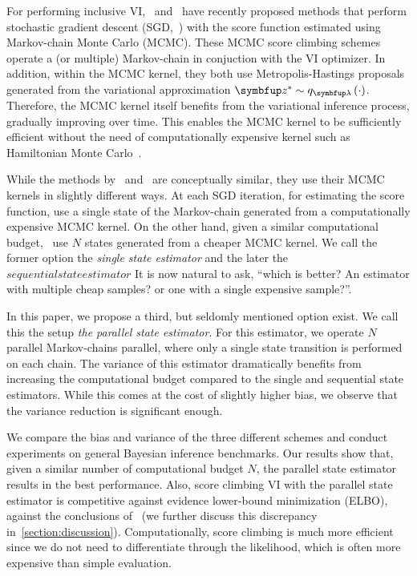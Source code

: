 For performing inclusive VI,~\citet{NEURIPS2020_b2070693} and~\citet{pmlr-v124-ou20a} have recently proposed  methods that perform stochastic gradient descent (SGD,~\citealt{robbins_stochastic_1951}) with the score function estimated using Markov-chain Monte Carlo (MCMC).
These MCMC score climbing schemes operate a (or multiple) Markov-chain in conjuction with the VI optimizer.
In addition, within the MCMC kernel, they both use Metropolis-Hastings proposals generated from the variational approximation \(\vz^* \sim q_{\vlambda}\left(\cdot\right)\).
Therefore, the MCMC kernel itself benefits from the variational inference process, gradually improving over time.
This enables the MCMC kernel to be sufficiently efficient without the need of computationally expensive kernel such as Hamiltonian Monte Carlo~\citep{duane_hybrid_1987, neal_mcmc_2011, betancourt_conceptual_2017}.

While the methods by~\citeauthor{NEURIPS2020_b2070693} and~\citeauthor{pmlr-v124-ou20a} are conceptually similar, they use their MCMC kernels in slightly different ways.
At each SGD iteration, for estimating the score function, \citeauthor{NEURIPS2020_b2070693} use a single state of the Markov-chain generated from a computationally expensive MCMC kernel.
On the other hand, given a similar computational budget,~\citeauthor{pmlr-v124-ou20a} use \(N\) states generated from a cheaper MCMC kernel.
We call the former option the \textit{single state estimator} and the later the \(sequential state estimator\)
It is now natural to ask, ``which is better? An estimator with multiple cheap samples? or one with a single expensive sample?''.

In this paper, we propose a third, but seldomly mentioned option exist.
We call this the setup \textit{the parallel state estimator}.
For this estimator, we operate \(N\) parallel Markov-chains parallel, where only a single state transition is performed on each chain.
The variance of this estimator dramatically benefits from increasing the computational budget compared to the single and sequential state estimators.
While this comes at the cost of slightly higher bias, we observe that the variance reduction is significant enough.

We compare the bias and variance of the three different schemes and conduct experiments on general Bayesian inference benchmarks.
Our results show that, given a similar number of computational budget \(N\), the parallel state estimator results in the best performance.
Also, score climbing VI with the parallel state estimator is competitive against evidence lower-bound minimization (ELBO), against the conclusions of~\cite{dhaka_challenges_2021} (we further discuss this discrepancy in~\cref{section:discussion}).
Computationally, score climbing is much more efficient since we do not need to differentiate through the likelihood, which is often more expensive than simple evaluation.

